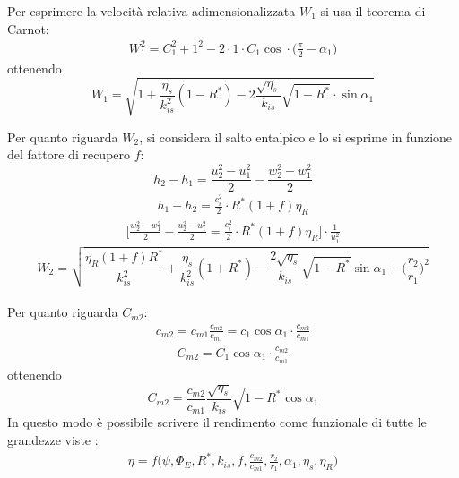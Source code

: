 Per esprimere la velocità relativa adimensionalizzata $W_1$ si usa il teorema di Carnot:
\begin{align*}
W_1^2 = C_1^2 + 1^2 - 2 \cdot 1 \cdot C_1 \cos \cdot \big( \frac{\pi}{2} - \alpha_1 \big)
\end{align*}
ottenendo
\begin{equation}
\boxed{ W_1 = \sqrt{1 + \frac{\eta_{s}}{k_{is}^2} \left( 1 - R^* \right) - 2 \frac{\sqrt{\eta_s}}{k_{is}} \sqrt{1-R^*} \cdot \sin \alpha_1}}
\label{eq:W1}
\end{equation}

Per quanto riguarda $W_2$, si considera il salto entalpico e lo si esprime in funzione del fattore di recupero $f$:
\begin{equation}
h_2 - h_1 = \frac{u_2^2 - u_1^2}{2} - \frac{w_2^2 - w_1^2}{2}
\end{equation}
\begin{align*}
h_1 - h_2 = \frac{c_i^2}{2} \cdot R^* \left( 1 + f \right) \eta_R
\end{align*}
\begin{align*}
\Bigg[\frac{w_2^2 - w_1^2}{2} - \frac{u_2^2 - u_1^2}{2} = \frac{c_i^2}{2} \cdot R^* \left( 1 + f \right) \eta_R \Bigg] \cdot \frac{1}{u_1^2}
\end{align*}
\begin{equation}
\boxed{W_2 = \sqrt{\frac{\eta_R \left( 1 + f \right) R^*}{k_{is}^2} + \frac{\eta_s}{k_{is}^2}  \left(1 + R^* \right) - \frac{2 \sqrt{\eta_s}}{k_{is}} \sqrt{1 - R^*} \sin \alpha_1 + \bigg(\frac{r_2}{r_1} \bigg)^2 } }
\end{equation}
\\Per quanto riguarda $C_{m2}$:
\begin{align*}
c_{m2} = c_{m1} \frac{c_{m2}}{c_{m1}}=c_1 \cos \alpha_1 \cdot \frac{c_{m2}}{c_{m1}}
\end{align*}
\begin{align*}
C_{m2} = C_1 \cos \alpha_1 \cdot \frac{c_{m2}}{c_{m1}}
\end{align*}
ottenendo
\begin{equation}
\boxed{C_{m2} = \frac{c_{m2}}{c_{m1}} \frac{\sqrt{\eta_s}}{k_{is}} \sqrt{1 - R^*} \cos \alpha_1 }
\end{equation}
In questo modo è possibile scrivere il rendimento come funzionale di tutte le grandezze viste :
\begin{align*}
\eta = f \bigg( \psi, \Phi_E, R^*, k_{is}, f, \frac{c_{m2}}{c_{m1}}, \frac{r_2}{r_1}, \alpha_1, \eta_s, \eta_R \bigg)
\end{align*}
